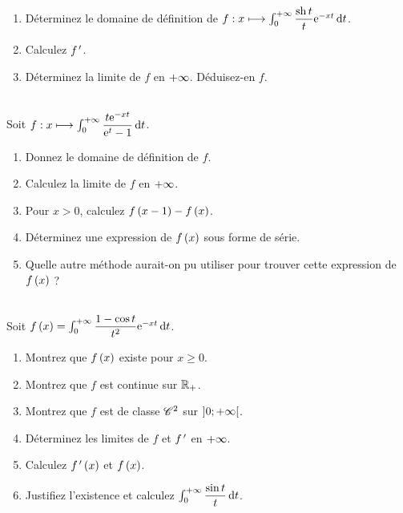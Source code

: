 \begin{exo}
\begin{enumerate}
    \item Déterminez le domaine de définition de \(f:x\mapsto\int_0^{\pinf}\dfrac{\sh t}{t}\e{-xt}\odif{t}\). \\
    \item Calculez \(f^{\,\prime}\). \\
    \item Déterminez la limite de \(f\) en \(+\infty\). Déduisez-en \(f\).
\end{enumerate}
\end{exo}

\begin{exo}~\\
Soit \(f:x\mapsto\int_0^{\pinf}\dfrac{t\e{-xt}}{\e{t}-1}\odif{t}\).

\begin{enumerate}
    \item Donnez le domaine de définition de \(f\). \\
    \item Calculez la limite de \(f\) en \(+\infty\). \\
    \item Pour \(x>0\), calculez \(f\left(x-1\right)-f\left(x\right)\). \\
    \item Déterminez une expression de \(f\left(x\right)\) sous forme de série. \\
    \item Quelle autre méthode aurait-on pu utiliser pour trouver cette expression de \(f\left(x\right)\) ?
\end{enumerate}
\end{exo}

\begin{exo}~\\
Soit \(f\paren{x}=\int_0^{\pinf}\dfrac{1-\cos t}{t^2}\e{-xt}\odif{t}\).

\begin{enumerate}
    \item Montrez que \(f\left(x\right)\) existe pour \(x\geq0\). \\
    \item Montrez que \(f\) est continue sur \(\mathbb{R}_+\). \\
    \item Montrez que \(f\) est de classe \(\mathscr{C}^{2}\) sur \(\left]0;+\infty\right[\). \\
    \item Déterminez les limites de \(f\) et \(f^{\,\prime}\) en \(+\infty\). \\
    \item Calculez \(f^{\,\prime}\left(x\right)\) et \(f\left(x\right)\). \\
    \item Justifiez l'existence et calculez \(\int_0^{\pinf}\dfrac{\sin t}{t}\odif{t}\).
\end{enumerate}
\end{exo}


